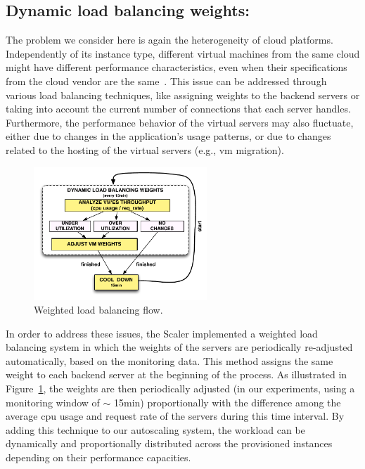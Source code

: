 

\subsection{Dynamic load balancing weights: } 

The problem we consider here is again the heterogeneity of cloud platforms.
Independently of its instance type, different virtual machines from the same cloud might have different performance
characteristics, even when their specifications from the cloud vendor are 
the same~\cite{ec2Performance}. This issue can be addressed through various 
load balancing techniques, like assigning weights to the backend servers or 
taking into account the current number of connections that each server 
handles. Furthermore, the performance behavior of the virtual servers may 
also fluctuate, either due to changes in the application's usage 
patterns, or due to changes related to the hosting of the virtual servers 
(e.g., vm migration).


\begin{figure}[htb]
  \begin{center}
    \includegraphics[height=5cm]{images/load_balancing}
  \end{center}
\vspace{-5mm}
  \caption{Weighted load balancing flow.}
  \label{fig:load_balancing}
\end{figure}


In order to address these issues, the Scaler implemented a weighted 
load balancing system in which the weights of the servers are 
periodically re-adjusted automatically, based on the monitoring data.  
This method assigns the same weight to each backend server at the 
beginning of the process. As illustrated in Figure~\ref{fig:load_balancing}, the weights are then periodically
adjusted (in our experiments, using a monitoring window of $\sim$ 15min) proportionally 
with the difference among the average cpu usage and request rate of the servers 
during this time interval. By adding this technique to our autoscaling system, 
the workload can be dynamically and proportionally distributed across the provisioned instances
depending on their performance capacities.




